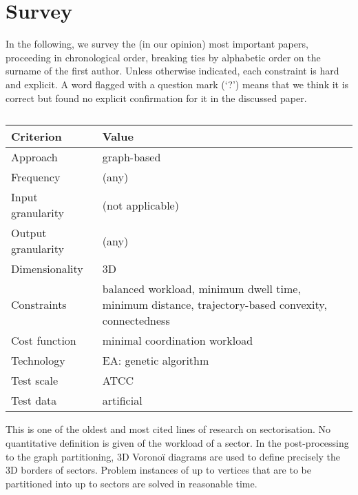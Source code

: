 \documentclass[a4paper,12pt]{article}
\begin{document}
\section{Survey}
\label{sect:survey}

In the following, we survey the (in our opinion) most important
papers, proceeding in chronological order, breaking ties by alphabetic
order on the surname of the first author.  Unless otherwise indicated,
each constraint is hard and explicit.  A word flagged with a question
mark (`?') means that we think it is correct but found no explicit
confirmation for it in the discussed paper.

\subsection{\cite{Delahaye:ICEC98}}

\begin{center}
\begin{tabular}{|l|l|}
  \hline
  Criterion & Value \\
  \hline\hline
  Approach & graph-based \\ \hline
  Frequency & (any) \\ \hline
  Input granularity & (not applicable) \\ \hline
  Output granularity & (any) \\ \hline
  Dimensionality & 3D \\ \hline
  Constraints & \parbox{11.5cm}{balanced workload, minimum
    dwell time, minimum distance, trajectory-based convexity,
    connectedness} \\ \hline
  Cost function & minimal coordination workload \\ \hline
  Technology & EA: genetic algorithm \\ \hline
  Test scale & ATCC \\ \hline
  Test data & artificial \\ \hline
\end{tabular}
\end{center}
This is one of the oldest and most cited lines of research on
sectorisation.  No quantitative definition is given of the workload of
a sector.  In the post-processing to the graph partitioning, 3D
Vorono\"i diagrams are used to define precisely the 3D borders of
sectors.  Problem instances of up to  vertices that are to be
partitioned into up to  sectors are solved in reasonable time.

\subsection{\cite{Yousefi:ATIO04}}
\end{document}
